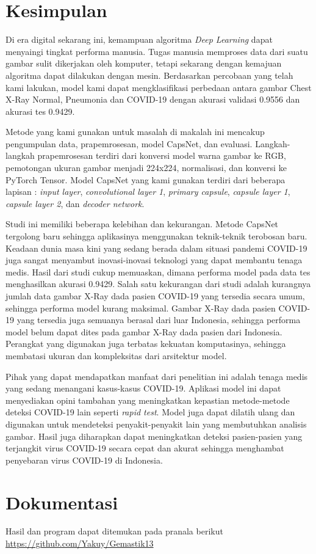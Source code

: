 \documentclass{article}
\begin{document}
   \section{Kesimpulan}
    Di era digital sekarang ini, kemampuan algoritma \textit{Deep Learning} dapat menyaingi tingkat performa manusia. Tugas manusia memproses data dari suatu gambar sulit dikerjakan oleh komputer, tetapi sekarang dengan kemajuan algoritma dapat dilakukan dengan mesin. Berdasarkan percobaan yang telah kami lakukan, model kami dapat mengklasifikasi perbedaan antara gambar Chest X-Ray Normal, Pneumonia dan COVID-19 dengan akurasi validasi 0.9556 dan akurasi tes 0.9429.
    \par
    Metode yang kami gunakan untuk masalah di makalah ini mencakup pengumpulan data, prapemrosesan, model CapsNet, dan evaluasi. Langkah-langkah prapemrosesan terdiri dari konversi model warna gambar ke RGB, pemotongan ukuran gambar menjadi 224x224, normalisasi, dan konversi ke PyTorch Tensor. Model CapsNet yang kami gunakan  terdiri dari beberapa lapisan : \textit{input layer}, \textit{convolutional layer 1}, \textit{primary capsule}, \textit{capsule layer 1}, \textit{capsule layer 2}, dan \textit{decoder network}.
    \par
    Studi ini memiliki beberapa kelebihan dan kekurangan. Metode CapsNet tergolong baru sehingga aplikasinya menggunakan teknik-teknik terobosan baru. Keadaan dunia masa kini yang sedang berada dalam situasi pandemi COVID-19 juga sangat menyambut inovasi-inovasi teknologi yang dapat membantu tenaga medis. Hasil dari studi cukup memuaskan, dimana performa model pada data tes menghasilkan akurasi 0.9429. Salah satu kekurangan dari studi adalah kurangnya jumlah data gambar X-Ray dada pasien COVID-19 yang tersedia secara umum, sehingga performa model kurang maksimal. Gambar X-Ray dada pasien COVID-19 yang tersedia juga semuanya berasal dari luar Indonesia, sehingga performa model belum dapat dites pada gambar X-Ray dada pasien dari Indonesia. Perangkat yang digunakan juga terbatas kekuatan komputasinya, sehingga membatasi ukuran dan kompleksitas dari arsitektur model.
    \par
    Pihak yang dapat mendapatkan manfaat dari penelitian ini adalah tenaga medis yang sedang menangani kasus-kasus COVID-19. Aplikasi model ini dapat menyediakan opini tambahan yang meningkatkan kepastian metode-metode deteksi COVID-19 lain seperti \textit{rapid test}. Model juga dapat dilatih ulang dan digunakan untuk mendeteksi penyakit-penyakit lain yang membutuhkan analisis gambar. Hasil juga diharapkan dapat meningkatkan deteksi pasien-pasien yang terjangkit virus COVID-19 secara cepat dan akurat sehingga menghambat penyebaran virus COVID-19 di Indonesia.  
   
   \section{Dokumentasi}
   Hasil dan program dapat ditemukan pada pranala berikut \url{https://github.com/Yakuy/Gemastik13}
   \newpage
   \printbibliography[title=Daftar Pustaka]
\end{document}
